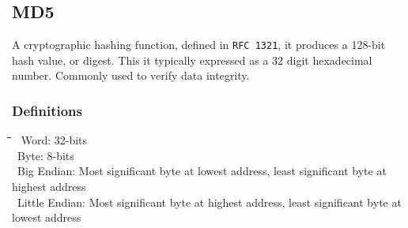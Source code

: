 \documentclass[10pt,letterpaper]{scrartcl}
\newcommand{\tbul}{\textbullet}
\newcommand{\tabDef}{\hspace{2em}\=\hspace{2em}\=\hspace{2em}\=\hspace{2em}\=\kill}
\begin{document}
\subsection{MD5}
A cryptographic hashing function, defined in \texttt{RFC 1321}, it produces a 128-bit hash value, or digest. This it typically expressed as a 32 digit hexadecimal number. Commonly used to verify data integrity.
\subsubsection{Definitions}
\begin{tabbing}\tabDef
\tbul\ Word: 32-bits \\
\tbul\ Byte: 8-bits \\
\tbul\ Big Endian: Most significant byte at lowest address, least significant byte at highest address \\
\tbul\ Little Endian: Most significant byte at highest address, least significant byte at lowest address
\end{tabbing}
\end{document}

